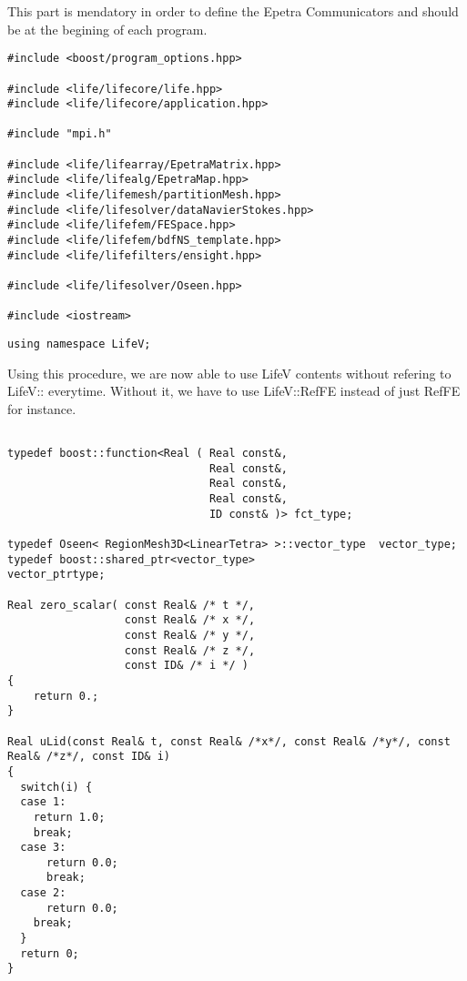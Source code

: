 This part is mendatory in order to define the Epetra Communicators and should be
at the begining of each program.


\begin{verbatim}
#include <boost/program_options.hpp>

#include <life/lifecore/life.hpp>
#include <life/lifecore/application.hpp>

#include "mpi.h"

#include <life/lifearray/EpetraMatrix.hpp>
#include <life/lifealg/EpetraMap.hpp>
#include <life/lifemesh/partitionMesh.hpp>
#include <life/lifesolver/dataNavierStokes.hpp>
#include <life/lifefem/FESpace.hpp>
#include <life/lifefem/bdfNS_template.hpp>
#include <life/lifefilters/ensight.hpp>

#include <life/lifesolver/Oseen.hpp>

#include <iostream>
\end{verbatim}



\begin{verbatim}
using namespace LifeV;
\end{verbatim}

Using this procedure, we are now able to use LifeV contents without refering to LifeV:: everytime.
Without it, we have to use LifeV::RefFE instead of just RefFE for instance.


\begin{verbatim}

typedef boost::function<Real ( Real const&,
                               Real const&,
                               Real const&,
                               Real const&,
                               ID const& )> fct_type;

typedef Oseen< RegionMesh3D<LinearTetra> >::vector_type  vector_type;
typedef boost::shared_ptr<vector_type>                   vector_ptrtype;

Real zero_scalar( const Real& /* t */,
                  const Real& /* x */,
                  const Real& /* y */,
                  const Real& /* z */,
                  const ID& /* i */ )
{
    return 0.;
}

Real uLid(const Real& t, const Real& /*x*/, const Real& /*y*/, const Real& /*z*/, const ID& i)
{
  switch(i) {
  case 1:
    return 1.0;
    break;
  case 3:
      return 0.0;
      break;
  case 2:
      return 0.0;
    break;
  }
  return 0;
}

\end{verbatim}

